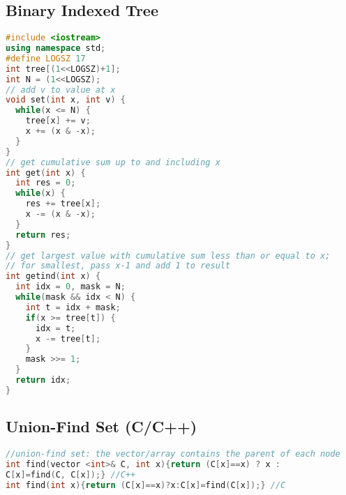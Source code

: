 \subsection{Binary Indexed Tree}
\begin{lstlisting}[language=C++]
#include <iostream>
using namespace std;
#define LOGSZ 17
int tree[(1<<LOGSZ)+1];
int N = (1<<LOGSZ);
// add v to value at x
void set(int x, int v) {
  while(x <= N) {
    tree[x] += v;
    x += (x & -x);
  }
}
// get cumulative sum up to and including x
int get(int x) {
  int res = 0;
  while(x) {
    res += tree[x];
    x -= (x & -x);
  }
  return res;
}
// get largest value with cumulative sum less than or equal to x;
// for smallest, pass x-1 and add 1 to result
int getind(int x) {
  int idx = 0, mask = N;
  while(mask && idx < N) {
    int t = idx + mask;
    if(x >= tree[t]) {
      idx = t;
      x -= tree[t];
    }
    mask >>= 1;
  }
  return idx;
}
\end{lstlisting}
\subsection{Union-Find Set (C/C++)}
\begin{lstlisting}[language=C++]
//union-find set: the vector/array contains the parent of each node
int find(vector <int>& C, int x){return (C[x]==x) ? x : 
C[x]=find(C, C[x]);} //C++
int find(int x){return (C[x]==x)?x:C[x]=find(C[x]);} //C
\end{lstlisting}
